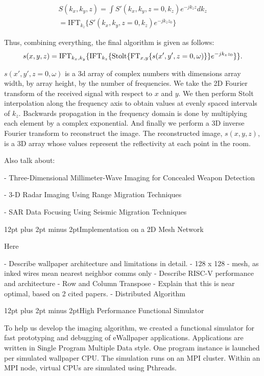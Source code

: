 \documentclass[twocolumn]{article}
\makeatletter
\def\section{\@startsection{section}{1}{\z@}{24pt plus 2 pt
minus 2 pt} {12pt plus 2pt minus 2pt}{\large\bf}}
\makeatother
\begin{document}
\begin{gather}
S(k_{x},k_{y},z)  =  \int S'(k_{x},k_{y},z=0,k_{z})e^{-jk_{z}z}dk_{z}\\
  =  \text{IFT}_{k_{z}}\{S'(k_{x},k_{y},z=0,k_{z})e^{-jk_{z}z_{0}}\}
\end{gather}

Thus, combining everything, the final algorithm is given as follows:
\[
s(x,y,z)=\text{IFT}_{k_{x},k_{y}}\{\text{IFT}_{k_{z}}\{\text{\text{Stolt}}\{\text{FT}_{x,y}\{s(x',y',z=0,\omega)\}\}e^{-jk_{z}z_{0}}\}\}.
\]

$s(x', y', z=0, \omega)$ is a 3d array of complex numbers with dimensions array width, by array height, by the number of frequencies. We take the 2D Fourier transform of the received signal with respect to $x$ and $y$. We then perform Stolt interpolation along the frequency axis to obtain values at evenly spaced intervals of $k_z$. Backwards propagation in the frequency domain is done by multiplying each element by a complex exponential. And finally we perform a 3D inverse Fourier transform to reconstruct the image. The reconstructed image, $s(x,y,z)$, is a 3D array whose values represent the reflectivity at each point in the room.

Also talk about:

- Three-Dimensional Millimeter-Wave Imaging for Concealed Weapon Detection

- 3-D Radar Imaging Using Range Migration Techniques

- SAR Data Focusing Using Seismic Migration Techniques

\section{Implementation on a 2D Mesh Network}

Here

- Describe wallpaper architecture and limitations in detail.
  - 128 x 128
  - mesh, as inked wires mean nearest neighbor comms only
  - Describe RISC-V performance and architecture
- Row and Column Transpose
- Explain that this is near optimal, based on 2 cited papers.
- Distributed Algorithm

\section{High Performance Functional Simulator}

To help us develop the imaging algorithm, we created a functional simulator for fast prototyping and debugging of eWallpaper applications. Applications are written in Single Program Multiple Data style. One program instance is launched per simulated wallpaper CPU. The simulation runs on an MPI cluster. Within an MPI node, virtual CPUs are simulated using Pthreads.
\end{document}
